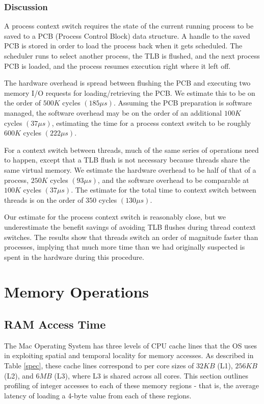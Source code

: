 \documentclass[sigconf]{acmart}
\begin{document}
\subsubsection{Discussion}
A process context switch requires the state of the current running process to be saved to a PCB (Process Control Block) data structure. A handle to the saved PCB is stored in order to load the process back when it gets scheduled. The scheduler runs to select another process, the TLB is flushed, and the next process PCB is loaded, and the process resumes execution right where it left off. 

The hardware overhead is spread between flushing the PCB and executing two memory I/O requests for loading/retrieving the PCB. We estimate this to be on the order of $500K$ cycles $(185 \mu s)$. Assuming the PCB preparation is software managed, the software overhead may be on the order of an additional $100K$ cycles $(37 \mu s)$, estimating the time for a process context switch to be roughly $600K$ cycles $(222 \mu s)$.

For a context switch between threads, much of the same series of operations need to happen, except that a TLB flush is not necessary because threads share the same virtual memory. We estimate the hardware overhead to be half of that of a process, $250K$ cycles $(93 \mu s)$, and the software overhead to be comparable at $100K$ cycles $(37 \mu s)$. The estimate for the total time to context switch between threads is on the order of $350$ cycles $(130 \mu s)$.

Our estimate for the process context switch is reasonably close, but we underestimate the benefit savings of avoiding TLB flushes during thread context switches. The results show that threads switch an order of magnitude faster than processes, implying that much more time than we had originally suspected is spent in the hardware during this procedure.

\section{Memory Operations}

\subsection{RAM Access Time}
The Mac Operating System has three levels of CPU cache lines that the OS uses in exploiting spatial and temporal locality for memory accesses. As described in Table \ref{spec}, these cache lines correspond to per core sizes of $32KB$ (L1), $256KB$ (L2), and $6MB$ (L3), where L3 is shared across all cores. This section outlines profiling of integer accesses to each of these memory regions - that is, the average latency of loading a 4-byte value from each of these regions.
\end{document}
